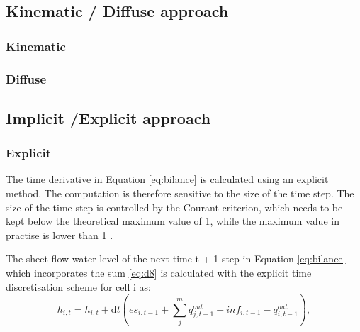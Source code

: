  

    \subsection{Kinematic / Diffuse approach}

        \subsubsection{Kinematic}
        \subsubsection{Diffuse}

    \subsection{Implicit /Explicit approach}

        \subsubsection{Explicit}
            The time derivative in Equation \ref{eq:bilance} is calculated using an
            explicit method. The computation is therefore sensitive to the size of the time
            step. The size of the time step is controlled by the Courant criterion, which
            needs to be kept below the theoretical maximum value of 1, while the maximum
            value in practise is lower than 1 
            \cite{zhang1989modeling, esteves2000overland}.


            The sheet flow water level of the next time t + 1 step in Equation
            \ref{eq:bilance} which incorporates the sum \ref{eq:d8} is calculated with the
            explicit time discretisation scheme for cell i as:
            \begin{equation} 
            h_{i,t} =h_{i,t} + \mathrm{d}t (es_{i,t-1} + \sum_j^m q^{out}_{j,t-1}-
            inf_{i,t-1} - q^{out}_{i,t-1}),
            \label{eq:bilance}
            \end{equation}

